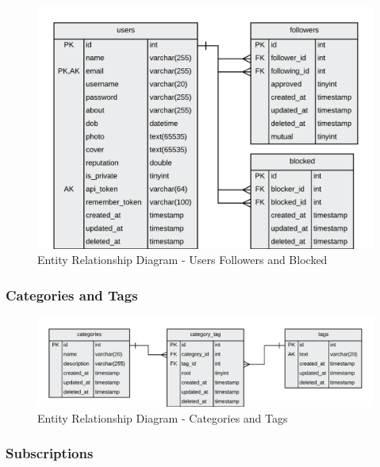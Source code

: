 \begin{figure}[H]
  \centering
  \includegraphics[width=1.0\textwidth]{Images/Design/Database/Followers}
  \caption{Entity Relationship Diagram - Users Followers and Blocked} \label{fig:ERD_Followers}
\end{figure}

\subsubsection{Categories and Tags}


\begin{figure}[H]
  \centering
  \includegraphics[width=1.0\textwidth]{Images/Design/Database/Categories}
  \caption{Entity Relationship Diagram - Categories and Tags} \label{fig:ERD_Categories}
\end{figure}

\subsubsection{Subscriptions}

